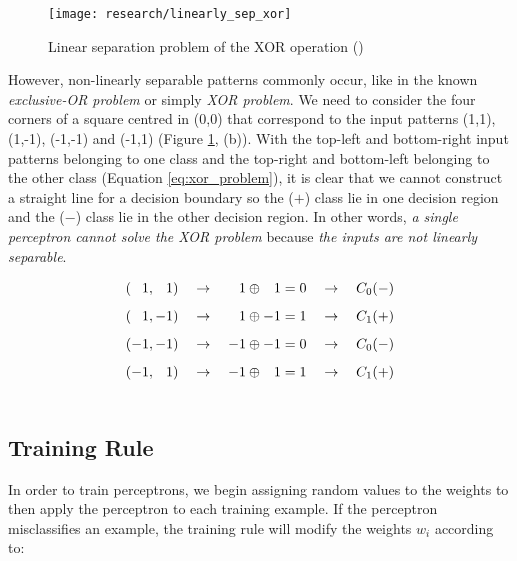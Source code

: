 	\begin{figure}[!ht]
		\centering
		\texttt{[image: research/linearly\_sep\_xor]}
		\caption{Linear separation problem of the XOR operation (\cite{mitchell1997})}
		\label{fig:linear_sep_xor}
	\end{figure}

	However, non-linearly separable patterns commonly occur, like in the known \textit{exclusive-OR problem} or simply \textit{XOR problem}. We need to consider the four corners of a square centred in (0,0) that correspond to the input patterns (1,1), (1,-1), (-1,-1) and (-1,1) (Figure \ref{fig:linear_sep_xor}, (b)). With the top-left and bottom-right input patterns belonging to one class and the top-right and bottom-left belonging to the other class (Equation \ref{eq:xor_problem}), it is clear that we cannot construct a straight line for a decision boundary so the ($+$) class lie in one decision region and the ($-$) class lie in the other decision region. In other words, \textit{a single perceptron cannot solve the XOR problem} because \textit{the inputs are not linearly separable}.

	\begin{equation}
		\label{eq:xor_problem}
	    \begin{aligned}
	        (\hspace{0.78em} 1,\hspace{0.78em} 1) \quad \rightarrow \quad  \hspace{0.78em} 1 \oplus \hspace{0.78em} 1 = 0 \quad \rightarrow \quad C_0(-) \\[5pt]
	        (\hspace{0.78em} 1,-1) \quad \rightarrow \quad  \hspace{0.78em} 1 \oplus -1 = 1 \quad \rightarrow \quad C_1(+) \\[5pt]
	        (-1,-1) \quad \rightarrow \quad -1 \oplus -1 = 0 \quad \rightarrow \quad C_0(-) \\[5pt]
	        (-1, \hspace{0.78em} 1) \quad \rightarrow \quad -1 \oplus \hspace{0.78em} 1 = 1 \quad \rightarrow \quad C_1(+) \\[15pt]
	    \end{aligned}
	\end{equation}

	\subsection{Training Rule}
	In order to train perceptrons, we begin assigning random values to the weights to then apply the perceptron to each training example. If the perceptron misclassifies an example, the training rule will modify the weights $w_i$ according to:

